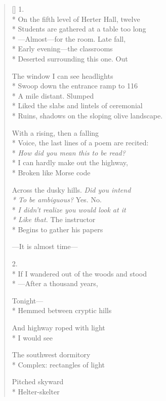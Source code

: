 \label{ch:evening_class}
\settowidth{\versewidth}{On the far side of the bridge, approaching Northampton,}
\begin{verse}[\versewidth]
1.\\*
On the fifth level of Herter Hall, twelve\\*
Students are gathered at a table too long\\*
---Almost---for the room.  Late fall,\\*
Early evening---the classrooms \\*
Deserted surrounding this one.  \qquad Out

The window I can see headlights\\*
Swoop down the entrance ramp to 116\\*
A mile distant.   Slumped\\*
Liked the slabs and lintels of ceremonial\\*
Ruins, shadows on the sloping olive landscape.

With a rising, then a falling \\*
Voice, the last lines of a poem are recited:\\*
\textit{How did you mean this to be read?}\\*
I can hardly make out the highway,\\*
Broken like Morse code

Across the dusky hills.  \textit{Did you intend\\*
To be ambiguous?}   Yes.  No.\\*
\textit{I didn't realize you would look at it\\*
Like that.} \qquad The instructor \\*
Begins to gather his papers

---It is almost time---

2.\\*
If I wandered out of the woods and stood\\*
---After a thousand years, 

Tonight---\\*
Hemmed between cryptic hills

And highway roped with light\\*
I would see

The southwest dormitory\\*
Complex: rectangles of light 

Pitched skyward \\*
Helter-skelter 


\end{verse}
